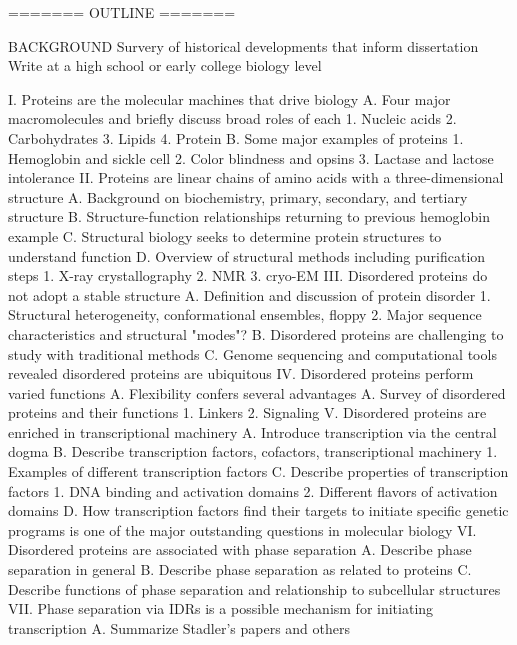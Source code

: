 ======= OUTLINE =======

BACKGROUND
Survery of historical developments that inform dissertation
Write at a high school or early college biology level

I. Proteins are the molecular machines that drive biology
    A. Four major macromolecules and briefly discuss broad roles of each
        1. Nucleic acids
        2. Carbohydrates
        3. Lipids
        4. Protein
    B. Some major examples of proteins
        1. Hemoglobin and sickle cell
        2. Color blindness and opsins
        3. Lactase and lactose intolerance
II. Proteins are linear chains of amino acids with a three-dimensional structure
    A. Background on biochemistry, primary, secondary, and tertiary structure
    B. Structure-function relationships returning to previous hemoglobin example
    C. Structural biology seeks to determine protein structures to understand function
    D. Overview of structural methods including purification steps
        1. X-ray crystallography
        2. NMR
        3. cryo-EM
III. Disordered proteins do not adopt a stable structure
    A. Definition and discussion of protein disorder
        1. Structural heterogeneity, conformational ensembles, floppy
        2. Major sequence characteristics and structural "modes"?
    B. Disordered proteins are challenging to study with traditional methods
    C. Genome sequencing and computational tools revealed disordered proteins are ubiquitous
IV. Disordered proteins perform varied functions
    A. Flexibility confers several advantages
    A. Survey of disordered proteins and their functions
        1. Linkers
        2. Signaling
V. Disordered proteins are enriched in transcriptional machinery
    A. Introduce transcription via the central dogma
    B. Describe transcription factors, cofactors, transcriptional machinery
        1. Examples of different transcription factors
    C. Describe properties of transcription factors
        1. DNA binding and activation domains
        2. Different flavors of activation domains
    D. How transcription factors find their targets to initiate specific genetic programs is one of the major outstanding questions in molecular biology
VI. Disordered proteins are associated with phase separation
    A. Describe phase separation in general
    B. Describe phase separation as related to proteins
    C. Describe functions of phase separation and relationship to subcellular structures
VII. Phase separation via IDRs is a possible mechanism for initiating transcription
    A. Summarize Stadler's papers and others

